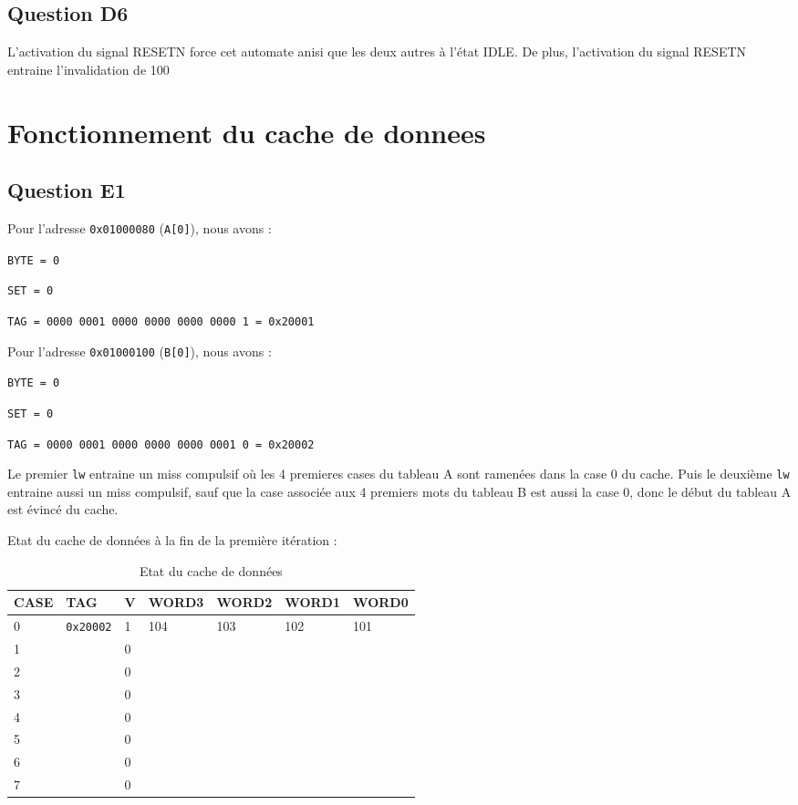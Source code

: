 \documentclass{article}
\begin{document}
\subsection{Question D6}

L'activation du signal RESETN force cet automate anisi que les deux autres
à l'état IDLE. De plus, l'activation du signal RESETN entraine l'invalidation
de 100%


\section{Fonctionnement du cache de donnees}

\subsection{Question E1}

Pour l'adresse \texttt{0x01000080} (\texttt{A[0]}), nous avons :

\texttt{BYTE = 0} 

\texttt{SET = 0} 

\texttt{TAG = 0000 0001 0000 0000 0000 0000 1 = 0x20001}

Pour l'adresse \texttt{0x01000100} (\texttt{B[0]}), nous avons :

\texttt{BYTE = 0} 

\texttt{SET = 0} 

\texttt{TAG = 0000 0001 0000 0000 0000 0001 0 = 0x20002}

Le premier \texttt{lw} entraine un miss compulsif où les 4 premieres cases
du tableau A sont ramenées dans la case 0 du cache. Puis le deuxième
\texttt{lw} entraine aussi un miss compulsif, sauf que la case associée
aux 4 premiers mots du tableau B est aussi la case 0, donc le début du
tableau A est évincé du cache.

Etat du cache de données à la fin de la première itération :
\begin{table}[H]
\centering
\begingroup
\setlength{\tabcolsep}{5pt}
\renewcommand{\arraystretch}{1.1}
\begin{tabular}{| l | l | l | l | l | l | l |}

\hline
CASE & TAG & V & WORD3 & WORD2 & WORD1 & WORD0 \\
\hline
0 &\texttt{0x20002} & 1 & 104 & 103 & 102 & 101 \\ 
\hline
1&&0&&&&\\
\hline
2&&0&&&&\\
\hline
3&&0&&&&\\
\hline
4&&0&&&&\\
\hline
5&&0&&&&\\
\hline
6&&0&&&&\\
\hline
7&&0&&&&\\
\hline

\end{tabular}
\caption{Etat du cache de données}
\endgroup
\end{table}
\end{document}
